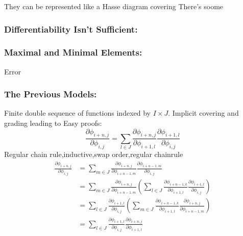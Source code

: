 They can be represented like a Hasse diagram
covering 
There's soome 

\subsubsection{Differentiability Isn't Sufficient:}

\subsubsection{Maximal and Minimal Elements:}
Error

\subsubsection{The Previous Models:}
Finite double sequence of functions indexed by $I\times J$.
Implicit covering and grading leading to Easy proofs:
\[\frac{\partial \phi_{i+n,j}}{\partial \phi_{i,j}} = \sum_{l\in J}\frac{\partial \phi_{i+n,j}}{\partial \phi_{i+1,l}}\frac{\partial \phi_{i+1,l}}{\partial \phi_{i,j}}\]
Regular chain rule,inductive,swap order,regular chainrule
\[\begin{aligned}
	\frac{\partial \phi_{i+n,j}}{\partial \phi_{i,j}} &= \sum_{m\in J}\frac{\partial \phi_{i+n,j}}{\partial \phi_{i+n-1,m}}\frac{\partial \phi_{i+n-1,m}}{\partial \phi_{i,j}}\\
	&= \sum_{m\in J}\frac{\partial \phi_{i+n,j}}{\partial \phi_{i+n-1,m}}\left(\sum_{l\in J}\frac{\partial \phi_{i+n-1,k}}{\partial \phi_{i+1,l}}\frac{\partial \phi_{i+1,l}}{\partial \phi_{i,j}}\right)\\
	&= \sum_{l\in J}\frac{\partial \phi_{i+1,l}}{\partial \phi_{i,j}}\left(\sum_{m\in J}\frac{\partial \phi_{i+n-1,k}}{\partial \phi_{i+1,l}}\frac{\partial \phi_{i+n,j}}{\partial \phi_{i+n-1,m}}\right)\\
	&= \sum_{l\in J}\frac{\partial \phi_{i+1,l}}{\partial \phi_{i,j}}\frac{\partial \phi_{i+n,j}}{\partial \phi_{i+1,l}}\\
\end{aligned}\]
